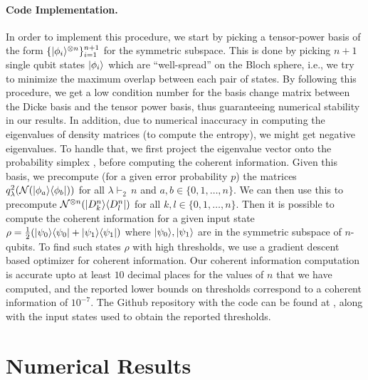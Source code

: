 \documentclass[11pt]{article}
\DeclarePairedDelimiter\bra{\langle}{\rvert}
\DeclarePairedDelimiter\ket{\lvert}{\rangle}
\begin{document}
\paragraph{Code Implementation.} In order to implement this procedure, we start by picking a tensor-power basis of the form $\{\ket{\phi_i}^{\otimes n}\}_{i=1}^{n+1}$ for the symmetric subspace. This is done by picking $n+1$ single qubit states $\ket{\phi_i}$ which are ``well-spread'' on the Bloch sphere, i.e., we try to minimize the maximum overlap between each pair of states. By following this procedure, we get a low condition number for the basis change matrix between the Dicke basis and the tensor power basis, thus guaranteeing numerical stability in our results. In addition, due to numerical inaccuracy in computing the eigenvalues of density matrices (to compute the entropy), we might get negative eigenvalues. To handle that, we first project the eigenvalue vector onto the probability simplex \cite{algo}, before computing the coherent information. Given this basis, we precompute (for a given error probability $p$) the matrices $q^2_{\lambda}(\mathcal{N}(\ket{\phi_a}\bra{\phi_b}))$ for all $\lambda \vdash_2\, n$ and $a, b \in \{0, 1, \ldots, n\}$. We can then use this to precompute $\mathcal{N}^{\otimes n}(\ket{D_{k}^n}\bra{D_{l}^n})$ for all $k, l \in \{0, 1, \ldots, n\}$. Then it is possible to compute the coherent information for a given input state $\rho= \frac{1}{2}(\ket{\psi_0}\bra{\psi_0} + \ket{\psi_1}\bra{\psi_1})$ where $\ket{\psi_0}, \ket{\psi_1}$ are in the symmetric subspace of $n$-qubits. To find such states $\rho$ with high thresholds, we use a gradient descent based optimizer for coherent information. Our coherent information computation is accurate upto at least $10$ decimal places for the values of $n$ that we have computed, and the reported lower bounds on thresholds correspond to a coherent information of $10^{-7}$. The Github repository with the code can be found at \cite{github}, along with the input states used to obtain the reported thresholds.

\section{Numerical Results}
\label{sectionnumerics}
\end{document}
